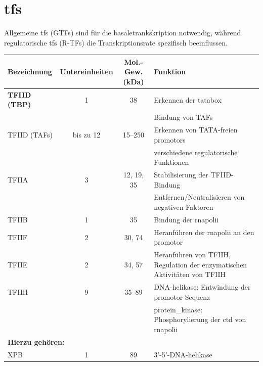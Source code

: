 \section{\glspl{tf}}\label{sec:glspl{tf}}
Allgemeine \glspl{tf} (GTFs) sind für die \gls{basaletrankskription} notwendig, während regulatorische \glspl{tf} (R-TFs) die Transkriptionsrate spezifisch beeinflussen.
\begin{table}[ht]
    \centering
    \begin{tabular}{|l|c|c|p{8cm}|}
        \hline
        \textbf{Bezeichnung} & \textbf{Untereinheiten} & \textbf{Mol.-Gew. (kDa)} & \textbf{Funktion}                               \\
        \hline
        \textbf{TFIID (TBP)} & 1 & 38 &
        Erkennen der \gls{tatabox} \\
        &                         &                          & Bindung von TAFs                                \\
        \hline
        TFIID (TAFs) & bis zu 12 & 15--250 &
        Erkennen von TATA-freien \glspl{promotor} \\
        &                         &                          & verschiedene regulatorische Funktionen          \\
        \hline
        TFIIA & 3 & 12, 19, 35 &
        Stabilisierung der TFIID-Bindung \\
        &                         &                          & Entfernen/Neutralisieren von negativen Faktoren \\
        \hline
        TFIIB & 1 & 35 &
        Bindung der \gls{rnapolii} \\
        \hline
        TFIIF & 2 & 30, 74 &
        Heranführen der \gls{rnapolii} an den \gls{promotor} \\
        \hline
        TFIIE & 2 & 34, 57 &
        Heranführen von TFIIH, Regulation der enzymatischen Aktivitäten von TFIIH \\
        \hline
        TFIIH & 9 & 35--89 &
        DNA-\gls{helikase}: Entwindung der \gls{promotor}-Sequenz \\
        & & &
        \gls{protein_kinase}: Phosphorylierung der \gls{ctd} von \gls{rnapolii} \\
        \hline
        \multicolumn{4}{|l|}{\textbf{Hierzu gehören:}} \\
        \hline
        XPB                  & 1                       & 89                       & 3'-5'-DNA-\gls{helikase}                              \\

\end{tabular}
\end{table}
